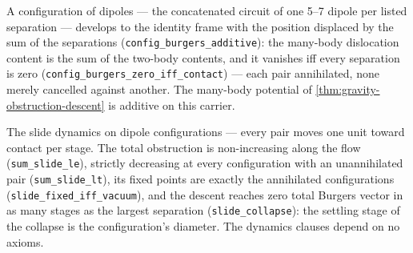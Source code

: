 \begin{theorem}\label{thm:config-burgers-additive}\leanok{}
A configuration of dipoles — the concatenated circuit of one 5--7 dipole
per listed separation — develops to the identity frame with the position
displaced by the sum of the separations
(\texttt{config\_burgers\_additive}): the many-body dislocation content is
the sum of the two-body contents, and it vanishes iff every separation is
zero (\texttt{config\_burgers\_zero\_iff\_contact}) --- each pair
annihilated, none merely cancelled against another. The many-body
potential of \cref{thm:gravity-obstruction-descent} is additive on this
carrier.
\end{theorem}

\begin{theorem}\label{thm:obstruction-descent-dynamics}\leanok{}
The slide dynamics on dipole configurations --- every pair moves one unit
toward contact per stage. The total obstruction is non-increasing along
the flow (\texttt{sum\_slide\_le}), strictly decreasing at every
configuration with an unannihilated pair (\texttt{sum\_slide\_lt}), its
fixed points are exactly the annihilated configurations
(\texttt{slide\_fixed\_iff\_vacuum}), and the descent reaches zero total
Burgers vector in as many stages as the largest separation
(\texttt{slide\_collapse}): the settling stage of the collapse is the
configuration's diameter. The dynamics clauses depend on no axioms.
\end{theorem}

